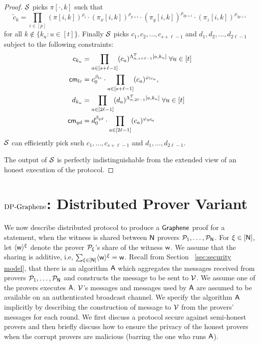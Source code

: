 \begin{proof}
		$\mathcal{S}$ picks $\pi[\cdot,k]$ such that 
		$$\tilde{c}_k = \prod_{i\in[p]}(\pi[i,k])^{\rho_i}\cdot (\pi_x[i,k])^{\rho_{p+i}}\cdot(\pi_y[i,k])^{\rho_{2p+i}}\cdot(\pi_z[i,k])^{\rho_{3p+i}}$$
		for all $k\notin\{k_u:u\in[t]\}$.
		Finally $\mathcal{S}$ picks $c_1,c_2,\ldots, c_{s+\ell-1}$ and $d_1, d_2, \ldots, d_{2\ell-1}$ subject to the following constraints:
		\begin{align*}
			c_{k_u} &= \prod_{a\in[s+\ell-1]} (c_a)^{\Lambda_{n,s+\ell-1}^T[a,k_u]} \; \forall u\in[t]\\  
			\mathsf{cm}_{lc} &= c_0^{\beta_{lc}}\cdot\prod_{a\in[s+\ell-1]}(c_a)^{\varphi_{lc_a}}, \\
			d_{k_u} &= \prod_{a\in[2\ell-1]} (d_a)^{\Lambda_{n,2\ell-1}^T[a,k_u]} \; \forall u\in[t]\\
			\mathsf{cm}_{qd} &= d_0^{\beta_{qd}}\cdot\prod_{a\in[2\ell-1]}(c_a)^{\varphi_{qd_a}}
		\end{align*}
		$\mathcal{S}$ can efficiently pick such $c_1, \ldots, c_{s+\ell-1}$ and $d_1, \ldots, d_{2\ell-1}$. 
		
		The output of $\mathcal{S}$ is perfectly indistinguishable from the extended view of an honest execution of the protocol.
\end{proof}



\section{$\text{DP-Graphene}$: Distributed Prover Variant}\label{sec:dpgraphen}
We now describe distributed protocol to produce a $\textsf{Graphene}$ proof for a
statement, when the witness is shared between $\mathsf{N}$ provers $\mathcal{P}_1,\ldots,\mathcal{P}_{\mathsf{N}}$. For $\xi\in [\mathsf{N}]$,
let $\langle{\mathsf{w}}\rangle^\xi$ denote the prover $\mathcal{P}_\xi$'s share of the witness $\mathsf{w}$.
We assume that the sharing is additive, i.e, $\sum_{\xi\in [\mathsf{N}]} \langle{\mathsf{w}}\rangle^\xi =
\mathsf{w}$. Recall from Section ~\ref{sec:security model}, that there is an algorithm $\mathsf{A}$ 
which aggregates the messages received
from provers $\mathcal{P}_1,\ldots,\mathcal{P}_{\mathsf{N}}$ and constructs the message to be
sent to  $\mathcal{V}$. We assume one of the provers executes $\mathsf{A}$.
$\mathcal{V}$'s  messages and messages used by $\mathsf{A}$ 
are assumed to be available on an authenticated broadcast
channel. We specify the algorithm $\mathsf{A}$ implicitly by describing the construction
of message to $\mathcal{V}$ from the provers' messages for each round.
We first discuss a protocol secure against semi-honest provers and then 
briefly discuss how to ensure the privacy of the honest provers when the corrupt 
provers are malicious (barring the one who runs $\mathsf{A}$). 

